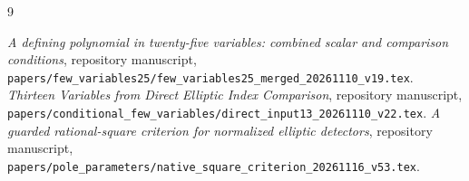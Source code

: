\documentclass[11pt,a4paper]{article}
\begin{document}
\begin{thebibliography}{9}\raggedright
{}\emph{A defining polynomial in twenty-five variables:
combined scalar and comparison conditions}, repository manuscript,
\nolinkurl{papers/few_variables25/few_variables25_merged_20261110_v19.tex}.
\emph{Thirteen Variables from Direct Elliptic
Index Comparison}, repository manuscript,
\nolinkurl{papers/conditional_few_variables/direct_input13_20261110_v22.tex}.
\emph{A guarded rational-square criterion for normalized
elliptic detectors}, repository manuscript,
\nolinkurl{papers/pole_parameters/native_square_criterion_20261116_v53.tex}.
\end{thebibliography}
\end{document}
